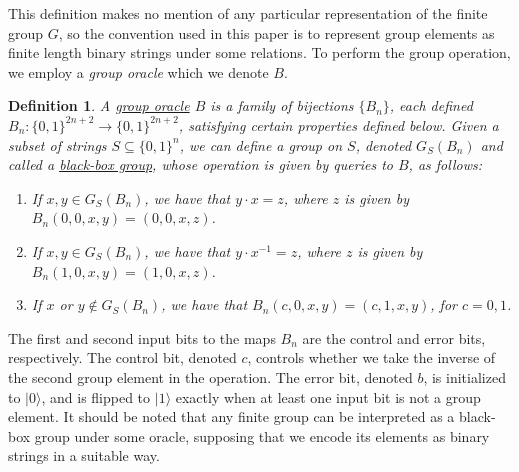 \documentclass[12pt]{article}
\newtheorem{defn}{Definition}
\numberwithin{thm}{section}
\numberwithin{defn}{section}
\numberwithin{prop}{section}
\numberwithin{rmk}{section}
\newcommand{\ket}[1]{\vert #1 \rangle}
\begin{document}
	This definition makes no mention of any particular representation of the finite group $G$, so the convention used in this paper is to represent group elements as finite length binary strings under some relations. To perform the group operation, we employ a \textit{group oracle} which we denote $B$. 
	\begin{defn}
		A \underline{group oracle} $B$ is a family of bijections $\{B_n\}$, each defined $B_n\colon \{0,1\}^{2n+2}\to  \{0,1\}^{2n+2}$, satisfying certain properties defined below. Given a subset of strings $S\subseteq \{0,1\}^n$, we can define a group on $S$, denoted $G_S(B_n)$ and called a \underline{\textit{black-box group}}, whose operation is given by queries to $B$, as follows:
		\begin{enumerate}[label=(\roman*)]
			\item If $x,y\in G_S(B_n)$, we have that $y\cdot x=z$, where $z$ is given by $B_n(0,0,x,y)=(0,0,x,z)$.
			\item If $x,y\in G_S(B_n)$, we have that $y\cdot x^{-1}=z$, where $z$ is given by $B_n(1,0,x,y)=(1,0,x,z)$.
			\item If $x$ or $y\notin G_S(B_n)$, we have that $B_n(c,0,x,y)=(c,1,x,y)$, for $c=0,1$.
		\end{enumerate}
	\end{defn}
	The first and second input bits to the maps $B_n$ are the control and error bits, respectively. The control bit, denoted $c$, controls whether we take the inverse of the second group element in the operation. The error bit, denoted $b$, is initialized to $\ket{0}$, and is flipped to $\ket{1}$ exactly when at least one input bit is not a group element. It should be noted that any finite group can be interpreted as a black-box group under some oracle, supposing that we encode its elements as binary strings in a suitable way.\\
	
\end{document}

